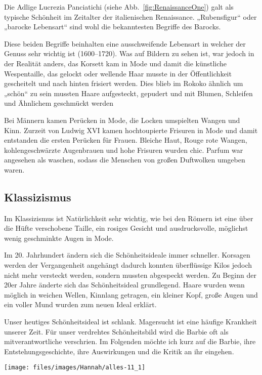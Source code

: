 Die Adlige Lucrezia Panciatichi (siehe Abb.~\vref{fig:RenaissanceOne}) galt als typische
Schönheit im Zeitalter der italienischen Renaissance. „Rubensfigur“ oder „barocke Lebensart“ sind
wohl die bekanntesten Begriffe des Barocks.


Diese beiden Begriffe beinhalten eine ausschweifende Lebensart in welcher der Genuss sehr wichtig ist
(1600--1720). Was auf Bildern zu sehen ist, war jedoch in der Realität anders, das Korsett kam in
Mode und damit die künstliche Wespentaille, das gelockt oder wellende Haar musste in der
Öffentlichkeit gescheitelt und nach hinten frisiert werden.
Dies blieb im Rokoko ähnlich um „schön“ zu sein mussten Haare aufgesteckt, gepudert und mit Blumen,
Schleifen und Ähnlichem geschmückt werden

Bei Männern kamen Perücken in Mode, die Locken umspielten Wangen und Kinn.
Zurzeit von Ludwig XVI kamen hochtoupierte Frisuren in Mode und damit entstanden die ersten Perücken
für Frauen. Bleiche Haut, Rouge rote Wangen, kohlengeschwärzte Augenbrauen und hohe Frisuren wurden
chic. Parfum war angesehen als waschen, sodass die Menschen
von großen Duftwolken umgeben waren.

\subsection{Klassizismus}
Im Klassizismus ist Natürlichkeit sehr wichtig, wie bei den Römern ist eine über die Hüfte
verschobene Taille, ein rosiges Gesicht und ausdrucksvolle, möglichst wenig geschminkte Augen in
Mode.

Im 20. Jahrhundert ändern sich die Schönheitsideale immer schneller. Korsagen werden der
Vergangenheit angehängt dadurch konnten überflüssige Kilos jedoch nicht mehr versteckt werden,
sondern mussten abgespeckt werden. Zu Beginn der 20er Jahre änderte sich das Schönheitsideal
grundlegend. Haare wurden wenn möglich in weichen Wellen, Kinnlang getragen, ein kleiner Kopf, große
Augen und ein voller Mund wurden zum neuen Ideal erklärt.

Unser heutiges Schönheitsideal ist schlank. Magersucht ist eine häufige Krankheit unserer Zeit. Für
unser verdrehtes Schönheitsbild wird die Barbie oft als mitverantwortliche verschrien. Im Folgenden
möchte ich kurz auf die Barbie, ihre Entstehungsgeschichte, ihre Auswirkungen und die Kritik an ihr
eingehen.

\begin{figurewrapper}
	\texttt{[image: files/images/Hannah/alles-11\_1]}%
\end{figurewrapper}

